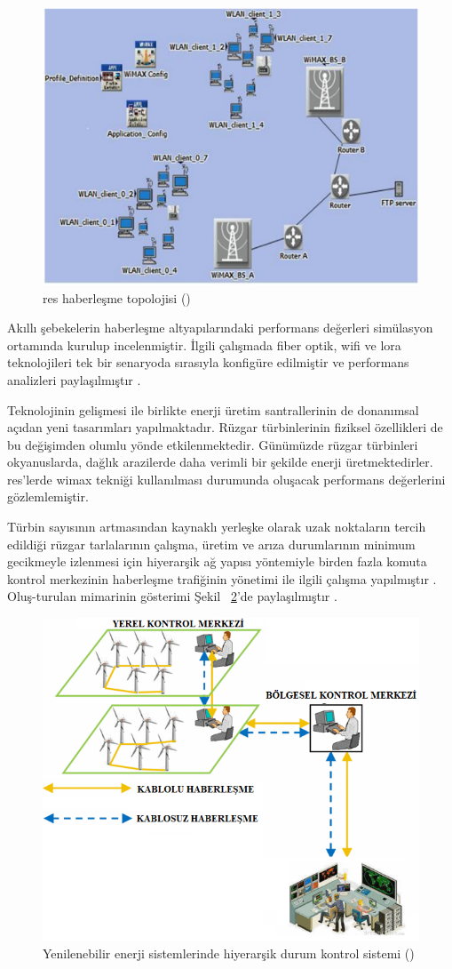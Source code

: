 \begin{figure}[htbp]
\centerline{\includegraphics[width=12cm]{Resim/Sekil2-3.png}}
\caption{\gls{res} haberleşme topolojisi (\protect{}) }
\label{fig:figure4}
\end{figure}

Akıllı şebekelerin haberleşme altyapılarındaki performans değerleri simülasyon ortamında kurulup incelenmiştir. İlgili çalışmada fiber optik, \gls{wifi} ve \gls{lora} teknolojileri tek bir senaryoda sırasıyla konfigüre edilmiştir ve performans analizleri paylaşılmıştır \cite{yuan2020modeling}. 



Teknolojinin gelişmesi ile birlikte enerji üretim santrallerinin de donanımsal açıdan yeni tasarımları yapılmaktadır. Rüzgar türbinlerinin fiziksel özellikleri de bu değişimden olumlu yönde etkilenmektedir. Günümüzde rüzgar türbinleri okyanuslarda, dağlık arazilerde daha verimli bir şekilde enerji üretmektedirler. \cite{liu2010status} \gls{res}'lerde \gls{wimax} tekniği kullanılması durumunda oluşacak performans değerlerini gözlemlemiştir.




Türbin sayısının artmasından kaynaklı yerleşke olarak uzak noktaların tercih edildiği rüzgar tarlalarının çalışma, üretim ve arıza durumlarının minimum gecikmeyle izlenmesi için hiyerarşik ağ yapısı yöntemiyle birden fazla komuta kontrol merkezinin haberleşme trafiğinin yönetimi ile ilgili çalışma yapılmıştır \cite{hussain2014multilayer}. Oluş-turulan mimarinin gösterimi Şekil ~\ref{fig:figure6}'de paylaşılmıştır .






\begin{figure}[htbp]
\centerline{\includegraphics[width= 8 cm]{Resim/Screenshot 2022-06-12 at 21.27.08.png}}
\caption{Yenilenebilir enerji sistemlerinde hiyerarşik durum kontrol sistemi (\protect{}) }
\label{fig:figure6}
\end{figure}
